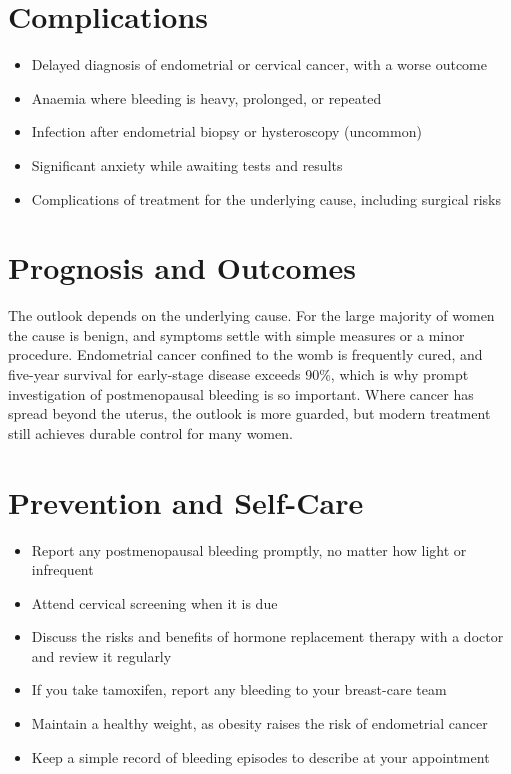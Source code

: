 \section*{Complications}
\begin{itemize}
    \item Delayed diagnosis of endometrial or cervical cancer, with a worse outcome
    \item Anaemia where bleeding is heavy, prolonged, or repeated
    \item Infection after endometrial biopsy or hysteroscopy (uncommon)
    \item Significant anxiety while awaiting tests and results
    \item Complications of treatment for the underlying cause, including surgical risks
\end{itemize}

\section*{Prognosis and Outcomes}
The outlook depends on the underlying cause. For the large majority of women the cause is benign, and symptoms settle with simple measures or a minor procedure. Endometrial cancer confined to the womb is frequently cured, and five-year survival for early-stage disease exceeds 90\%, which is why prompt investigation of postmenopausal bleeding is so important. Where cancer has spread beyond the uterus, the outlook is more guarded, but modern treatment still achieves durable control for many women.

\section*{Prevention and Self-Care}
\begin{itemize}
    \item Report any postmenopausal bleeding promptly, no matter how light or infrequent
    \item Attend cervical screening when it is due
    \item Discuss the risks and benefits of hormone replacement therapy with a doctor and review it regularly
    \item If you take tamoxifen, report any bleeding to your breast-care team
    \item Maintain a healthy weight, as obesity raises the risk of endometrial cancer
    \item Keep a simple record of bleeding episodes to describe at your appointment
\end{itemize}

